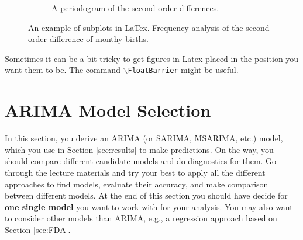 \documentclass[a4paper]{article}
\begin{document}
\begin{figure}[h!]
\begin{subfigure}[b]{0.45\textwidth}
        \caption{A periodogram of the second order differences. }
        \label{fig:diff2_birth_pdg}
    \end{subfigure}
		\caption{An example of subplots in
		LaTex. Frequency analysis of the second order difference of monthy births. }
		\label{fig:fd_analysis}
\end{figure}

Sometimes it can be a bit tricky to get figures in Latex placed in the position you want them to be. The command \texttt{$\backslash$FloatBarrier} might be useful.

\FloatBarrier

\section{ARIMA Model Selection}
\label{sec:arima_model}
In this section, you derive an ARIMA (or SARIMA, MSARIMA, etc.) model, which you use in Section \ref{sec:results} to make predictions. 
%
On the way, you should compare different candidate models and do diagnostics for them. 
%
Go through the lecture materials and try your best to apply all the different approaches to find models, evaluate their accuracy, and make comparison between different models.
%
At the end of this section you should have decide for \textbf{one single model} you want to work with for your analysis. You may also want to consider other models than ARIMA, e.g., a regression approach based on Section \ref{sec:FDA}. 
%
%


\end{document}
